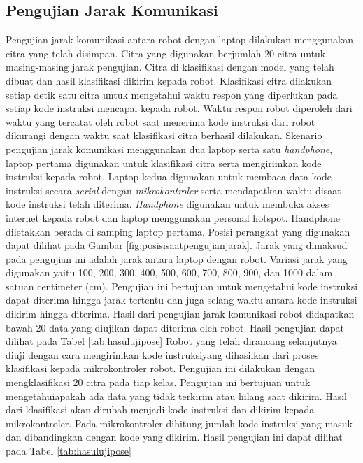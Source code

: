 \subsection{Pengujian Jarak Komunikasi}
Pengujian jarak komunikasi antara robot dengan laptop dilakukan menggunakan citra yang telah disimpan. Citra yang digunakan berjumlah 20 citra untuk masing-masing jarak pengujian. Citra di klasifikasi dengan model yang telah dibuat dan hasil klasifikasi dikirim kepada robot. Klasifikasi citra dilakukan setiap detik satu citra untuk mengetahui waktu respon yang diperlukan pada setiap kode instruksi mencapai kepada robot. Waktu respon robot diperoleh dari waktu yang tercatat oleh robot saat menerima kode instruksi dari robot dikurangi dengan waktu saat klasifikasi citra berhasil dilakukan. Skenario pengujian jarak komunikasi menggunakan dua laptop serta satu \emph{handphone}, laptop pertama digunakan untuk klasifikasi citra serta mengirimkan kode instruksi kepada robot. Laptop kedua digunakan untuk membaca data kode instruksi secara \emph{serial} dengan \emph{mikrokontroler} serta mendapatkan waktu disaat kode instruksi telah diterima. \emph{Handphone} digunakan untuk membuka akses internet kepada robot dan laptop menggunakan personal hotspot. Handphone diletakkan berada di samping laptop pertama. Posisi perangkat yang digunakan dapat dilihat pada Gambar \ref{fig:posisisaatpengujianjarak}. Jarak yang dimaksud pada pengujian ini adalah jarak antara laptop dengan robot. Variasi jarak yang digunakan yaitu 100, 200, 300, 400, 500, 600, 700, 800, 900, dan 1000 dalam satuan centimeter (cm). Pengujian ini bertujuan untuk mengetahui kode instruksi dapat diterima hingga jarak tertentu dan juga selang waktu antara kode instruksi dikirim hingga diterima. Hasil dari pengujian jarak komunikasi robot didapatkan bawah 20 data yang diujikan dapat diterima oleh robot. Hasil pengujian dapat dilihat pada Tabel \ref{tab:hasulujipose} 
Robot yang telah dirancang selanjutnya diuji dengan cara mengirimkan kode instruksiyang dihasilkan dari proses klasifikasi kepada mikrokontroler robot. Pengujian ini dilakukan dengan mengklasifikasi 20 citra pada tiap kelas. Pengujian ini bertujuan untuk mengetahuiapakah ada data yang tidak terkirim atau hilang saat dikirim. Hasil dari klasifikasi akan dirubah menjadi kode instruksi dan dikirim kepada mikrokontroler. Pada mikrokontroler dihitung jumlah kode instruksi yang masuk dan dibandingkan dengan kode yang dikirim. Hasil pengujian ini dapat dilihat pada Tabel \ref{tab:hasulujipose}

